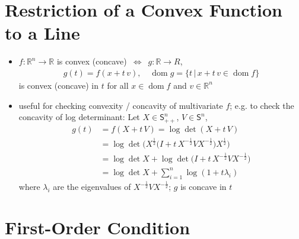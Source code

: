 \documentclass[11pt]{extarticle}
\newcommand{\ds}{\displaystyle}
\newcommand{\ifff}{\,\Longleftrightarrow\,}
\DeclareMathOperator*{\dom}{dom}
\theoremstyle{definition}
\begin{document}
\newpage

\section*{Restriction of a Convex Function to a Line}

\begin{itemize}
  \item $f:\mathbb{R}^n\to\mathbb{R}$ is convex (concave) $\ifff$ $g:\mathbb{R}\to R$, 
    \begin{align*}
      g(t) = f(x + t\,v), \quad\dom g = \{t\,|\, x+t\,v\in\dom f\}  
    \end{align*}
    is convex (concave) in $t$ for all $x\in\dom f$ and $v\in\mathbb{R}^n$
  \item useful for checking convexity / concavity of multivariate $f$; e.g. to check the concavity of log determinant: Let $X\in\mathsf{S}^n_{++}$, $V\in\mathsf{S}^n$,
    \begin{align*} 
      g(t) &= f(X + t\,V) = \log\det(X + t\,V) \\
           &= \log\det\big(X^{\frac{1}{2}}\big(I + t\,X^{-\frac{1}{2}}VX^{-\frac{1}{2}}\big)X^{\frac{1}{2}}\big) \\
           &= \log\det X + \log\det\big(I + t\,X^{-\frac{1}{2}}VX^{-\frac{1}{2}}\big) \\
           &= \log\det X + \sum_{i=1}^n\log(1 + t\lambda_i) 
         \end{align*}\vspace{-3em}
    where $\lambda_i$ are the eigenvalues of $\ds X^{-\frac{1}{2}}VX^{-\frac{1}{2}}$; $g$ is concave in $t$
\end{itemize}

\newpage

\section*{First-Order Condition}
\end{document}
